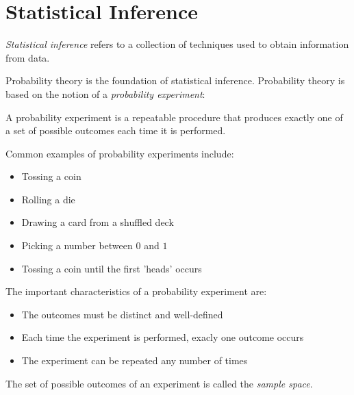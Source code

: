 \section{Statistical Inference}
\textit{Statistical inference} refers to a collection of techniques used to obtain information from data.
\par\vspace{0.5 cm}
Probability theory is the foundation of statistical inference.  Probability theory is based on the notion of a \textit{probability experiment}:
\par\vspace{0.5 cm}
\begin{definition} A probability experiment is a repeatable procedure that produces exactly one of a set of possible outcomes each time it is performed.
\end{definition}
\par\vspace{0.5 cm}
Common examples of probability experiments include:
\par\vspace{0.5 cm}
\begin{itemize}
\item Tossing a coin
\item Rolling a die
\item Drawing a card from a shuffled deck
\item Picking a number between $0$ and $1$
\item Tossing a coin until the first 'heads' occurs
\end{itemize}
\par\vspace{0.5 cm}
The important characteristics of a probability experiment are:
\par\vspace{0.5 cm}
\begin{itemize}
\item The outcomes must be distinct and well-defined
\item Each time the experiment is performed, exacly one outcome occurs
\item The experiment can be repeated any number of times
\end{itemize}
\par\vspace{0.5 cm}
The set of possible outcomes of an experiment is called the \textit{sample space}.
\par\vspace{0.5 cm}
